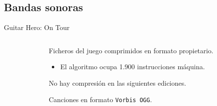 \subsection{Bandas sonoras}
\begin{frame}{Guitar Hero: On Tour}

\begin{columns}
    \begin{column}{0.35\textwidth}
    \end{column}

    \begin{column}{0.65\textwidth}
    \begin{wideitemize}
        \item<1-> Ficheros del juego comprimidos en formato propietario.
        \begin{itemize}
            \item<2-> El algoritmo ocupa 1.900 instrucciones máquina.
        \end{itemize}

        \item<3-> No hay compresión en las siguientes ediciones.

        \item<4-> Canciones en formato \texttt{Vorbis OGG}.
    \end{wideitemize}
    \end{column}
\end{columns}

\vfill
{}

\end{frame}

